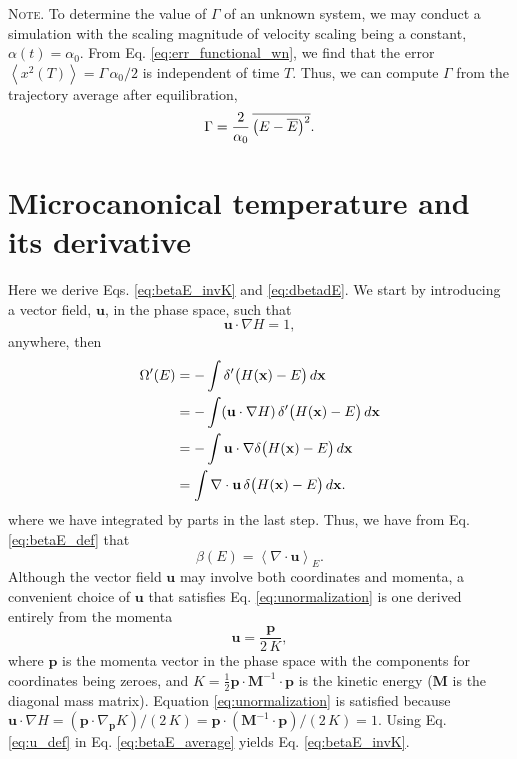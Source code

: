 \documentclass[reprint]{revtex4-1}
\newcommand{\note}[1]{{\color{DarkGreen}\footnotesize \textsc{Note.} #1}}
\begin{document}
\note{
  To determine the value of $\Gamma$ of an unknown system,
  we may conduct a simulation
  with the scaling magnitude of velocity scaling
  being a constant, $\alpha(t) = \alpha_0$.
  From Eq. \eqref{eq:err_functional_wn}, we find that
  the error
  $\left\langle
    x^2(T)
  \right\rangle
  =
  \Gamma \, \alpha_0 / 2$
  is independent of time $T$.
  Thus, we can compute $\Gamma$ from the trajectory average
  after equilibration,
  \begin{equation}
  \Gamma
  =
  \frac{ 2 } { \alpha_0 } \,
  \overline{
    \bigl(
      E - \overline E
    \bigr)^2
  }
  .
  \notag
  \end{equation}
}

\section{Microcanonical temperature and its derivative}


Here we derive Eqs. \eqref{eq:betaE_invK} and \eqref{eq:dbetadE}.
We start by introducing a vector field, $\mathbf u$,
in the phase space,
such that
%
\begin{equation}
  \mathbf u \cdot \nabla H = 1
  ,
  \label{eq:unormalization}
\end{equation}
%
anywhere, then
%
\begin{align}
  \Omega'(E)
  &= -\int \delta'\bigl( H(\mathbf x) - E \bigr) \, d\mathbf x
     \notag \\
  &= -\int (\mathbf u \cdot \nabla H) \,
           \delta'\bigl( H(\mathbf x) - E \bigr) \, d\mathbf x
     \notag \\
  &= -\int \mathbf u \cdot
           \nabla \delta\bigl( H(\mathbf x) - E \bigr) \, d\mathbf x
     \notag \\
  &= \int \nabla \cdot \mathbf u \,
     \delta\bigl( H(\mathbf x) - E \bigr) \, d\mathbf x
  .
  \notag
\end{align}
%
where we have integrated by parts in the last step.
%
Thus, we have from Eq. \eqref{eq:betaE_def} that
%
\begin{equation}
  \beta(E)
  =
  \left\langle
    \nabla \cdot \mathbf u
  \right\rangle_E
  .
  \label{eq:betaE_average}
\end{equation}
%
Although the vector field $\mathbf u$ may involve both coordinates and momenta,
a convenient choice of $\mathbf u$ that satisfies
Eq. \eqref{eq:unormalization}
is one derived entirely from the momenta
%
\begin{equation}
  \mathbf u
  =
  \frac{ \mathbf p }
       {  2 \, K }
  ,
  \label{eq:u_def}
\end{equation}
where $\mathbf p$ is the momenta vector in the phase space
with the components for coordinates being zeroes,
and $K = \frac 1 2 \mathbf p \cdot \mathbf M^{-1} \cdot \mathbf p$
is the kinetic energy ($\mathbf M$ is the diagonal mass matrix).
%
Equation \eqref{eq:unormalization} is satisfied
because
$\mathbf u \cdot \nabla H
= (\mathbf p \cdot \nabla_{\mathbf p} K)/(2 \, K)
= \mathbf p \cdot (\mathbf M^{-1} \cdot \mathbf p) / (2 \, K) = 1$.
%
Using Eq. \eqref{eq:u_def} in Eq. \eqref{eq:betaE_average}
yields Eq. \eqref{eq:betaE_invK}.
\end{document}
